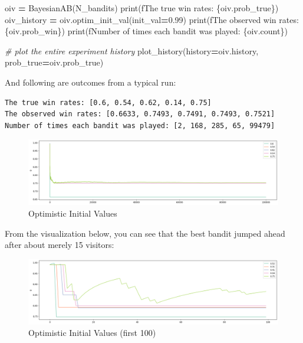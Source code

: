 \documentclass[
]{book}
\newenvironment{Shaded}{\begin{snugshade}}{\end{snugshade}}
\newcommand{\BuiltInTok}[1]{#1}
\newcommand{\CommentTok}[1]{\textcolor[rgb]{0.56,0.35,0.01}{\textit{#1}}}
\newcommand{\FloatTok}[1]{\textcolor[rgb]{0.00,0.00,0.81}{#1}}
\newcommand{\NormalTok}[1]{#1}
\newcommand{\OperatorTok}[1]{\textcolor[rgb]{0.81,0.36,0.00}{\textbf{#1}}}
\newcommand{\SpecialCharTok}[1]{\textcolor[rgb]{0.00,0.00,0.00}{#1}}
\newcommand{\SpecialStringTok}[1]{\textcolor[rgb]{0.31,0.60,0.02}{#1}}
\theoremstyle{definition}
\theoremstyle{definition}
\theoremstyle{definition}
\theoremstyle{definition}
\theoremstyle{remark}
\begin{document}
\begin{Shaded}
\begin{Highlighting}[]
\NormalTok{oiv }\OperatorTok{=}\NormalTok{ BayesianAB(N\_bandits)}
\BuiltInTok{print}\NormalTok{(}\SpecialStringTok{f\textquotesingle{}The true win rates: }\SpecialCharTok{\{}\NormalTok{oiv}\SpecialCharTok{.}\NormalTok{prob\_true}\SpecialCharTok{\}}\SpecialStringTok{\textquotesingle{}}\NormalTok{)}
\NormalTok{oiv\_history }\OperatorTok{=}\NormalTok{ oiv.optim\_init\_val(init\_val}\OperatorTok{=}\FloatTok{0.99}\NormalTok{)}
\BuiltInTok{print}\NormalTok{(}\SpecialStringTok{f\textquotesingle{}The observed win rates: }\SpecialCharTok{\{}\NormalTok{oiv}\SpecialCharTok{.}\NormalTok{prob\_win}\SpecialCharTok{\}}\SpecialStringTok{\textquotesingle{}}\NormalTok{)}
\BuiltInTok{print}\NormalTok{(}\SpecialStringTok{f\textquotesingle{}Number of times each bandit was played: }\SpecialCharTok{\{}\NormalTok{oiv}\SpecialCharTok{.}\NormalTok{count}\SpecialCharTok{\}}\SpecialStringTok{\textquotesingle{}}\NormalTok{)}

\CommentTok{\# plot the entire experiment history}
\NormalTok{plot\_history(history}\OperatorTok{=}\NormalTok{oiv.history, prob\_true}\OperatorTok{=}\NormalTok{oiv.prob\_true)}
\end{Highlighting}
\end{Shaded}

And following are outcomes from a typical run:

\begin{verbatim}
The true win rates: [0.6, 0.54, 0.62, 0.14, 0.75]
The observed win rates: [0.6633, 0.7493, 0.7491, 0.7493, 0.7521]
Number of times each bandit was played: [2, 168, 285, 65, 99479]
\end{verbatim}

\begin{figure}
\centering
\includegraphics{images/oiv.png}
\caption{Optimistic Initial Values}
\end{figure}

From the visualization below, you can see that the best bandit jumped ahead after about merely 15 visitors:

\begin{figure}
\centering
\includegraphics{images/oiv_100.png}
\caption{Optimistic Initial Values (first 100)}
\end{figure}
\end{document}
